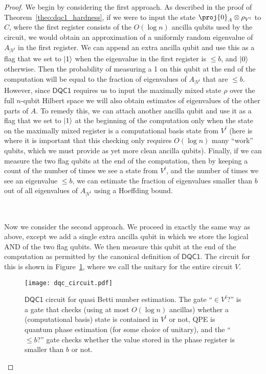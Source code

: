 \documentclass[11pt]{article}
\numberwithin{equation}{section}
\newcommand{\DQC}{\mathsf{DQC1}}
\renewcommand\( {\left(}
\renewcommand\) {\right)}
\begin{document}
\begin{proof}
We begin by considering the first approach. As described in the proof of Theorem~\ref{theo:dqc1_hardness}, if we were to input the state $\proj{0}_A \otimes \rho_{V^l}$ to $C$, where the first register consists of the $O(\log n)$ ancilla qubits used by the circuit, we would obtain an approximation of a uniformly random eigenvalue of $A_{| V^l}$ in the first register. We can append an extra ancilla qubit and use this as a flag that we set to $\ket{1}$ when the eigenvalue in the first register is $\leq b$, and $\ket{0}$ otherwise. Then the probability of measuring a 1 on this qubit at the end of the computation will be equal to the fraction of eigenvalues of $A_{| V^l}$ that are $\leq b$. However, since $\DQC$ requires us to input the maximally mixed state $\rho$ over the full $n$-qubit Hilbert space we will also obtain estimates of eigenvalues of the other parts of $A$. To remedy this, we can attach another ancilla qubit and use it as a flag that we set to $\ket{1}$ at the beginning of the computation only when the state on the maximally mixed register is a computational basis state from $V^l$ (here is where it is important that this checking only requires $O(\log n)$ many ``work'' qubits, which we must provide as yet more clean ancilla qubits). Finally, if we can measure the two flag qubits at the end of the computation, then by keeping a count of the number of times we see a state from $V^l$, and the number of times we see an eigenvalue $\leq b$, we can estimate the fraction of eigenvalues smaller than $b$ out of all eigenvalues of $A_{| V^l}$ using a Hoeffding bound.  

\

Now we consider the second approach. We proceed in exactly the same way as above, except we add a single extra ancilla qubit in which we store the logical AND of the two flag qubits. We then measure this qubit at the end of the computation as permitted by the canonical definition of $\DQC$. The circuit for this is shown in Figure~\ref{fig:dqc1_circuit}, where we call the unitary for the entire circuit $V$.

\begin{figure}[h]
    \centering
    \texttt{[image: dqc\_circuit.pdf]}
    \caption{$\DQC$ circuit for quasi Betti number estimation. The gate ``$\in V^l$?'' is a gate that checks (using at most $O(\log n)$ ancillas) whether a (computational basis) state is contained in $V^l$ or not, QPE is quantum phase estimation (for some choice of unitary), and the ``$\leq b$?'' gate checks whether the value stored in the phase register is smaller than $b$ or not.}
    \label{fig:dqc1_circuit}
\end{figure}


\end{proof}
\end{document}
